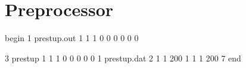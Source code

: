 \chapter{Preprocessor}


begin
1
prestup.out
1 
1
1
0
0
0
0
0
0

3
prestup
1
1
1
0
0
0
0
0
1
prestup.dat
2 1
1 200 1 1
1 200 7
end
